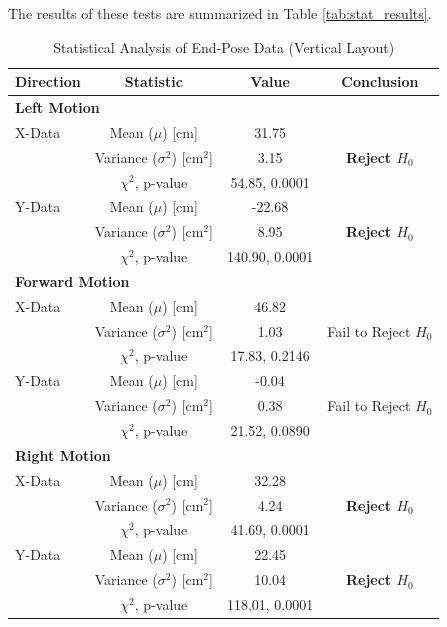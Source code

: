 The results of these tests are summarized in Table \ref{tab:stat_results}.


\begin{table}[htbp]
\centering
\begin{tabular}{@{}lccc@{}}
\toprule
\textbf{Direction} & \textbf{Statistic} & \textbf{Value} & \textbf{Conclusion} \\
\midrule

\multicolumn{4}{l}{\textbf{Left Motion}} \\
\midrule
X-Data & Mean ($\mu$) [cm] & 31.75 & \multirow{3}{*}{\textbf{Reject $H_0$}} \\
       & Variance ($\sigma^2$) [cm$^2$] & 3.15 &  \\
       & $\chi^2$, p-value & 54.85, 0.0001 &  \\
\addlinespace

Y-Data & Mean ($\mu$) [cm] & -22.68 & \multirow{3}{*}{\textbf{Reject $H_0$}} \\
       & Variance ($\sigma^2$) [cm$^2$] & 8.95 & \\
       & $\chi^2$, p-value & 140.90, 0.0001 & \\
\midrule

\multicolumn{4}{l}{\textbf{Forward Motion}} \\
\midrule
X-Data & Mean ($\mu$) [cm] & 46.82 & \multirow{3}{*}{Fail to Reject $H_0$} \\
       & Variance ($\sigma^2$) [cm$^2$] & 1.03 & \\
       & $\chi^2$, p-value & 17.83, 0.2146 & \\
\addlinespace

Y-Data & Mean ($\mu$) [cm] & -0.04 & \multirow{3}{*}{Fail to Reject $H_0$} \\
       & Variance ($\sigma^2$) [cm$^2$] & 0.38 & \\
       & $\chi^2$, p-value & 21.52, 0.0890 & \\
\midrule

\multicolumn{4}{l}{\textbf{Right Motion}} \\
\midrule
X-Data & Mean ($\mu$) [cm] & 32.28 & \multirow{3}{*}{\textbf{Reject $H_0$}} \\
       & Variance ($\sigma^2$) [cm$^2$] & 4.24 & \\
       & $\chi^2$, p-value & 41.69, 0.0001 & \\
\addlinespace

Y-Data & Mean ($\mu$) [cm] & 22.45 & \multirow{3}{*}{\textbf{Reject $H_0$}} \\
       & Variance ($\sigma^2$) [cm$^2$] & 10.04 & \\
       & $\chi^2$, p-value & 118.01, 0.0001 & \\
\bottomrule
\end{tabular}
\caption{Statistical Analysis of End-Pose Data (Vertical Layout)}
\label{tab:stat_results_vertical}
\end{table}

